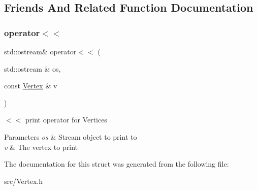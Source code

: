 \subsection{Friends And Related Function Documentation}
\mbox{\label{struct_vertex_aa80cb53b0a61b605b5e10d5b3fe9d505}} 
\subsubsection{\texorpdfstring{operator$<$$<$}{operator<<}}
{\footnotesize\ttfamily std\+::ostream\& operator$<$$<$ (\begin{DoxyParamCaption}\item[{std\+::ostream \&}]{os,  }\item[{const \mbox{\hyperlink{struct_vertex}{Vertex}} \&}]{v }\end{DoxyParamCaption})\hspace{0.3cm}{\ttfamily [friend]}}



$<$$<$ print operator for Vertices 


\begin{DoxyParams}{Parameters}
{\em os} & Stream object to print to \\
\hline
{\em v} & The vertex to print \\
\hline
\end{DoxyParams}


The documentation for this struct was generated from the following file\+:\begin{DoxyCompactItemize}
\item 
src/Vertex.\+h\end{DoxyCompactItemize}
